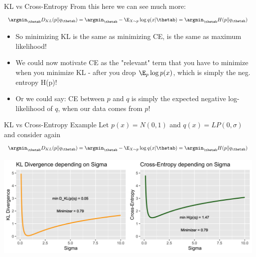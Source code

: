 \documentclass[11pt,compress,t,notes=noshow, xcolor=table]{beamer}
\begin{document}
\begin{vbframe}{KL vs Cross-Entropy}
From this here we can see much more:
$$ \argmin_{\thetab} D_{KL}(p \| q_{\thetab}) = \argmin_{\thetab} -\E_{X \sim p} \log q(x|\thetab) = \argmin_{\thetab} H(p \| q_{\thetab}) $$
  \begin{itemize}
    \item So minimizing KL is the same as minimizing CE, is the same as maximum likelihood!
    \item We could now motivate CE as the "relevant" term that you have to minimize when you minimize KL - after you drop $\E_p \log p(x)$, which is simply the neg. entropy H(p)!
    \item Or we could say: CE between $p$ and $q$ is simply the expected negative log-likelihood of $q$, when our data comes from $p$!
  \end{itemize}
\end{vbframe}

\begin{vbframe}{KL vs Cross-Entropy Example}
Let $p(x)=N(0,1)$ and $q(x)=LP(0,\sigma)$ and consider again
$$ \argmin_{\thetab} D_{KL}(p \| q_{\thetab}) = \argmin_{\thetab} -\E_{X \sim p} \log q(x|\thetab) = \argmin_{\thetab} H(p \| q_{\thetab}) $$

\begin{center}
	\includegraphics[width=1\textwidth]{figure/kl_ce_comparison.png}
\end{center}

\end{vbframe}
\end{document}
